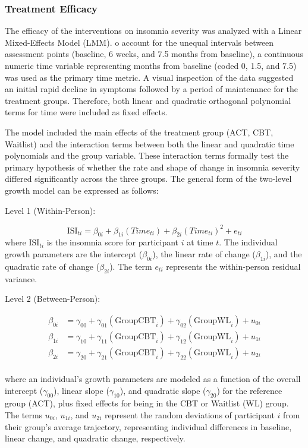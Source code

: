\documentclass[
  man]{apa6}
\begin{document}
\subsubsection{Treatment Efficacy}\label{treatment-efficacy}

The efficacy of the interventions on insomnia severity was analyzed with a Linear Mixed-Effects Model (LMM). o account for the unequal intervals between assessment points (baseline, 6 weeks, and 7.5 months from baseline), a continuous numeric time variable representing months from baseline (coded 0, 1.5, and 7.5) was used as the primary time metric. A visual inspection of the data suggested an initial rapid decline in symptoms followed by a period of maintenance for the treatment groups. Therefore, both linear and quadratic orthogonal polynomial terms for time were included as fixed effects.

The model included the main effects of the treatment group (ACT, CBT, Waitlist) and the interaction terms between both the linear and quadratic time polynomials and the group variable. These interaction terms formally test the primary hypothesis of whether the rate and shape of change in insomnia severity differed significantly across the three groups. The general form of the two-level growth model can be expressed as follows:

Level 1 (Within-Person):

\[
\text{ISI}_{ti} = \beta_{0i} + \beta_{1i} (Time_{ti}) + \beta_{2i} (Time_{ti})^2 + e_{ti} 
\]
where \(\text{ISI}_{ti}\) is the insomnia score for participant \(i\) at time \(t\). The individual growth parameters are the intercept (\(\beta_{0i}\)), the linear rate of change (\(\beta_{1i}\)), and the quadratic rate of change (\(\beta_{2i}\)). The term \(e_{ti}\) represents the within-person residual variance.

Level 2 (Between-Person):

\[
\begin{aligned}
  \beta_{0i} &= \gamma_{00} + \gamma_{01}(\text{GroupCBT}_i) + \gamma_{02}(\text{GroupWL}_i) + u_{0i}\\
  \beta_{1i} &= \gamma_{10} + \gamma_{11}(\text{GroupCBT}_i) + \gamma_{12}(\text{GroupWL}_i) + u_{1i}\\
  \beta_{2i} &= \gamma_{20} + \gamma_{21}(\text{GroupCBT}_i) + \gamma_{22}(\text{GroupWL}_i) + u_{2i}\\
\end{aligned}
\]

where an individual's growth parameters are modeled as a function of the overall intercept (\(\gamma_{00}\)), linear slope (\(\gamma_{10}\)), and quadratic slope (\(\gamma_{20}\)) for the reference group (ACT), plus fixed effects for being in the CBT or Waitlist (WL) group. The terms \(u_{0i}\), \(u_{1i}\), and \(u_{2i}\) represent the random deviations of participant \(i\) from their group's average trajectory, representing individual differences in baseline, linear change, and quadratic change, respectively.
\end{document}
